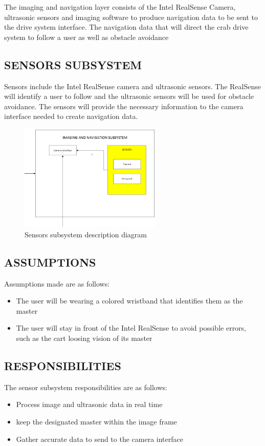 The imaging and navigation layer consists of the Intel RealSense Camera, ultrasonic sensors and imaging software to produce navigation data to be sent to the drive system interface. The navigation data that will direct the crab drive system to follow a user as well as obstacle avoidance

\subsection{SENSORS SUBSYSTEM}
Sensors include the Intel RealSense camera and ultrasonic sensors. The RealSense will identify a user to follow and the ultrasonic sensors will be used for obstacle avoidance. The sensors will provide the necessary information to the camera interface needed to create navigation data.

\begin{figure}[h!]
	\centering
 	\includegraphics[width=0.60\textwidth]{images/sensors}
 \caption{Sensors subsystem description diagram}
\end{figure}

\subsection{ASSUMPTIONS}
Assumptions made are as follows:
\begin{itemize}
\item The user will be wearing a colored wristband that identifies them as the master
\item The user will stay in front of the Intel RealSense to avoid possible errors, such as the cart loosing vision of its master
\end{itemize}

\subsection{RESPONSIBILITIES}
The sensor subsystem responsibilities are as follows:
\begin{itemize}
\item Process image and ultrasonic data in real time
\item keep the designated master within the image frame
\item Gather accurate data to send to the camera interface
\end{itemize}
